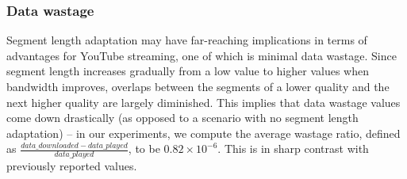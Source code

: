 \subsubsection{Data wastage}
Segment length adaptation may have far-reaching implications in terms of advantages for YouTube streaming, one of which is minimal data wastage. Since segment length increases gradually from a low value to higher values when bandwidth improves, overlaps between the segments of a lower quality and the next higher quality are largely diminished. This implies that data wastage values come down drastically (as opposed to a scenario with no segment length adaptation) – in our experiments, we compute the average wastage ratio, defined as $\frac{data\_downloaded - data\_played}{data\_played}$, to be $0.82\times10^{-6}$. This is in sharp contrast with previously reported values.
